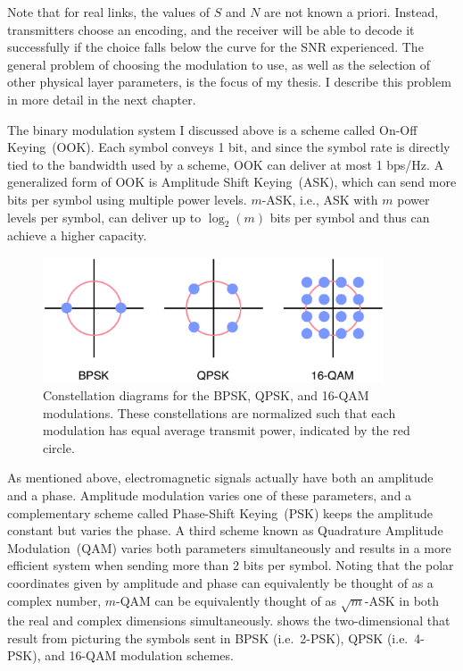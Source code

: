 Note that for real links, the values of $S$ and $N$ are not known a priori. Instead, transmitters choose an encoding, and the receiver will be able to decode it successfully if the choice falls below the curve for the SNR experienced. The general problem of choosing the modulation to use, as well as the selection of other physical layer parameters, is the focus of my thesis. I describe this problem in more detail in the next chapter.

The binary modulation system I discussed above is a scheme called On-Off Keying~(OOK\@). Each symbol conveys 1 bit, and since the symbol rate is directly tied to the bandwidth used by a scheme, OOK can deliver at most 1 bps/Hz. A generalized form of OOK is Amplitude Shift Keying~(ASK\@), which can send more bits per symbol using multiple power levels. $m$-ASK, i.e., ASK with $m$ power levels per symbol, can deliver up to $\log_2(m)$ bits per symbol and thus can achieve a higher capacity.

\begin{figure}[t]
\centering
\includegraphics[width=0.9\textwidth]{figures/constellations_radius}
\caption[Constellation diagrams for the BPSK, QPSK, and 16-QAM modulations]{\label{fig:constellations}Constellation diagrams for the BPSK, QPSK, and 16-QAM modulations. These constellations are normalized such that each modulation has equal average transmit power, indicated by the red circle.}
\end{figure}

As mentioned above, electromagnetic signals actually have both an amplitude and a phase. Amplitude modulation varies one of these parameters, and a complementary scheme called Phase-Shift Keying~(PSK) keeps the amplitude constant but varies the phase. A third scheme known as Quadrature Amplitude Modulation~(QAM) varies both parameters simultaneously and results in a more efficient system when sending more than 2 bits per symbol. Noting that the polar coordinates given by amplitude and phase can equivalently be thought of as a complex number, $m$-QAM can be equivalently thought of as $\sqrt{m}$-ASK in both the real and complex dimensions simultaneously.  shows the two-dimensional  that result from picturing the symbols sent in BPSK (i.e.\ 2-PSK), QPSK (i.e.\ 4-PSK), and 16-QAM modulation schemes.

